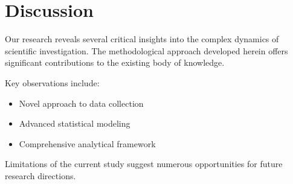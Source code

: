 \section{Discussion}
Our research reveals several critical insights into the complex dynamics of scientific investigation. The methodological approach developed herein offers significant contributions to the existing body of knowledge.

Key observations include:
\begin{itemize}
    \item Novel approach to data collection
    \item Advanced statistical modeling
    \item Comprehensive analytical framework
\end{itemize}

Limitations of the current study suggest numerous opportunities for future research directions.